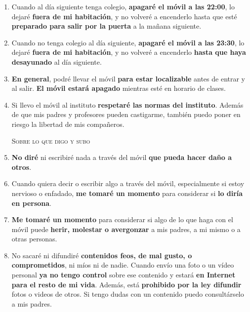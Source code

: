 \documentclass[12pt]{article}
\begin{document}
\begin{enumerate}
\item Cuando al día siguiente tenga colegio, \textbf{apagaré el móvil a las
  22:00}, lo dejaré \textbf{fuera de mi habitación}, y no volveré a encenderlo
  hasta que esté \textbf{preparado para salir por la puerta} a la mañana
  siguiente.

\item Cuando no tenga colegio al día siguiente, \textbf{apagaré el móvil a las
  23:30}, lo dejaré \textbf{fuera de mi habitación}, y no volveré a encenderlo
  \textbf{hasta que haya desayunado} al día siguiente.

\item \textbf{En general}, podré llevar el móvil \textbf{para estar
    localizable} antes de entrar y al salir. \textbf{El móvil estará apagado} mientras esté en horario de clases.

\item Si llevo el móvil al instituto \textbf{respetaré las normas del
  instituto}. Además de que mis padres y profesores pueden castigarme,
  también puedo poner en riesgo la libertad de mis compañeros.

\clearpage
\begin{center}
  \textsc{Sobre lo que digo y subo}
\end{center}

\item \textbf{No diré} ni escribiré nada a través del móvil
  \textbf{que pueda hacer daño a otros}.

\item Cuando quiera decir o escribir algo a través del móvil,
  especialmente si estoy nervioso o enfadado, \textbf{me tomaré un
    momento} para considerar si \textbf{lo diría en persona}.

\item \textbf{Me tomaré un momento} para considerar si algo de lo que haga con
  el móvil puede \textbf{herir, molestar o avergonzar} a mis padres, a mi mismo o a otras personas.

\item No sacaré ni difundiré \textbf{contenidos feos, de mal gusto, o
    comprometidos}, ni míos ni de nadie. Cuando envío una foto o un vídeo personal \textbf{ya no tengo control} sobre ese contenido y estará \textbf{en
  Internet para el resto de mi vida}. Además, está \textbf{prohibido por la ley difundir} fotos o videos de otros. Si tengo dudas con un contenido
  puedo consultárselo a mis padres.


\end{enumerate}
\end{document}
